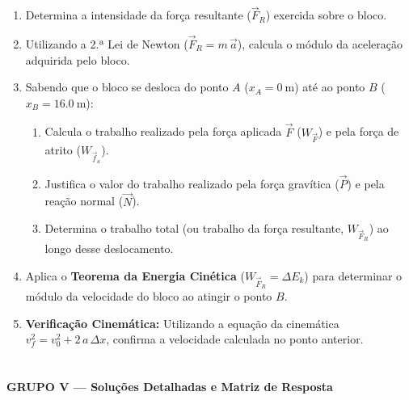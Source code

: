 \documentclass[11pt, a4paper]{article}
\begin{document}
\begin{enumerate}[label=\textbf{4.\arabic*}]
  \item Determina a intensidade da força resultante ($\vec{F}_R$) exercida sobre o bloco.

  \item Utilizando a 2.ª Lei de Newton ($\vec{F}_R = m\,\vec{a}$), calcula o módulo da aceleração adquirida pelo bloco.

  \item Sabendo que o bloco se desloca do ponto $A$ ($x_A = \SI{0}{\meter}$) até ao ponto $B$ ($x_B = \SI{16,0}{\meter}$):
  \begin{enumerate}[label=\alph*)]
    \item Calcula o trabalho realizado pela força aplicada $\vec{F}$ ($W_{\vec{F}}$) e pela força de atrito ($W_{\vec{f}_a}$).
    \item Justifica o valor do trabalho realizado pela força gravítica ($\vec{P}$) e pela reação normal ($\vec{N}$).
    \item Determina o trabalho total (ou trabalho da força resultante, $W_{\vec{F}_R}$) ao longo desse deslocamento.
  \end{enumerate}

  \item Aplica o \textbf{Teorema da Energia Cinética} ($W_{\vec{F}_R} = \Delta E_k$) para determinar o módulo da velocidade do bloco ao atingir o ponto $B$.

  \item \textbf{Verificação Cinemática:} Utilizando a equação da cinemática $v_f^2 = v_0^2 + 2\,a\,\Delta x$, confirma a velocidade calculada no ponto anterior.
\end{enumerate}

\newpage

\section*{}
\begin{center}
  \colorbox{primaryNavy}{\parbox{0.97\textwidth}{\color{white}\bfseries\large GRUPO V --- Soluções Detalhadas e Matriz de Resposta}}
\end{center}

\small
\end{document}
